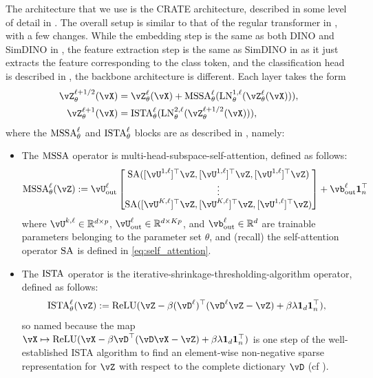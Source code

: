 \documentclass[../../book-main.tex]{subfiles}
\begin{document}
The architecture that we use is the CRATE architecture, described in some level of detail in . The overall setup is similar to that of the regular transformer in , with a few changes. While the embedding step is the same as both DINO and SimDINO in , the feature extraction step is the same as SimDINO in  as it just extracts the feature corresponding to the class token, and the classification head is described in , the backbone architecture is different. Each layer takes the form
\begin{align}\label{eq:CARTE updates}
    \vZ_{\theta}^{\ell + 1/2}(\vX)
    &= \vZ_{\theta}^{\ell}(\vX) + \MSSA_{\theta}^{\ell}(\LN_{\theta}^{1, \ell}(\vZ_{\theta}^{\ell}(\vX))), \\ 
    \vZ_{\theta}^{\ell + 1}(\vX)
    &= \ISTA_{\theta}^{\ell}(\LN_{\theta}^{2, \ell}(\vZ_{\theta}^{\ell + 1/2}(\vX))),
\end{align}
where the \(\operatorname{MSSA}_{\theta}^{\ell}\) and \(\operatorname{ISTA}_{\theta}^{\ell}\) blocks are as described in , namely:
\begin{itemize}
    \item The \(\operatorname{MSSA}\) operator is multi-head-subspace-self-attention, defined as follows:
    \begin{equation}
        \MSSA_{\theta}^{\ell}(\vZ) := \vU_{\out}^{\ell}\mat{\SA([\vU^{1, \ell}]^{\top}\vZ, [\vU^{1, \ell}]^{\top}\vZ, [\vU^{1, \ell}]^{\top}\vZ)\\ \vdots \\ \SA([\vU^{K, \ell}]^{\top}\vZ, [\vU^{K, \ell}]^{\top}\vZ, [\vU^{1, \ell}]^{\top}\vZ)} + \vb_{\out}^{\ell}\vone_{n}^{\top}
    \end{equation}
    where \(\vU^{k, \ell} \in \R^{d \times p}\), \(\vU_{\out}^{\ell} \in \R^{d \times Kp}\), and \(\vb_{\out}^{\ell} \in \R^{d}\) are trainable parameters belonging to the parameter set \(\theta\), and (recall) the self-attention operator \(\operatorname{SA}\) is defined in \eqref{eq:self_attention}.
    \item The \(\operatorname{ISTA}\) operator is the iterative-shrinkage-thresholding-algorithm operator, defined as follows:
    \begin{equation}
        \ISTA_{\theta}^{\ell}(\vZ) := \ReLU(\vZ - \beta (\vD^{\ell})^{\top}(\vD^{\ell}\vZ - \vZ) + \beta\lambda \vone_{d}\vone_{n}^{\top}),
    \end{equation}
    so named because the map \(\vX \mapsto \ReLU(\vX - \beta \vD^{\top}(\vD\vX - \vZ) + \beta  \lambda \vone_{d}\vone_{n}^{\top})\) is one step of the well-established ISTA algorithm to find an element-wise non-negative sparse representation for \(\vZ\) with respect to the complete dictionary \(\vD\) (cf ).
\end{itemize}
\end{document}
